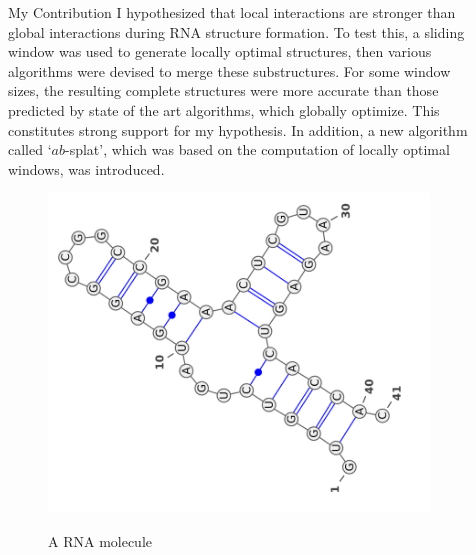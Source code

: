 \documentclass[final]{beamer}
\newlength{\sepwid}
\newlength{\onecolwid}
\begin{document}
\begin{frame}[t]
\begin{columns}[t]
\begin{column}{\onecolwid}
      \begin{block}{My Contribution}
		        I hypothesized that local interactions are stronger than global interactions during RNA structure formation. To test this, a sliding window was used to generate locally optimal structures, then various algorithms were devised to merge these substructures. For some window sizes, the resulting complete structures were more accurate than those predicted by state of the art algorithms, which globally optimize. This constitutes strong support for my hypothesis. In addition, a new algorithm called `$ab$-splat', which was based on the computation of locally optimal windows, was introduced.
        \vspace{0.25in}
        \begin{figure}
          \begin{center}
            \includegraphics[width=10in]{RNAexample.png} \\
            \caption{A RNA molecule}
            \label{fig:RNAexample}
          \end{center}
        \end{figure}
      \end{block}
    \end{column}
    
    
    
    
    
    \begin{column}{\sepwid}\end{column}			%
    \begin{column}{\onecolwid}
    

\end{column}
\end{columns}
\end{frame}
\end{document}
